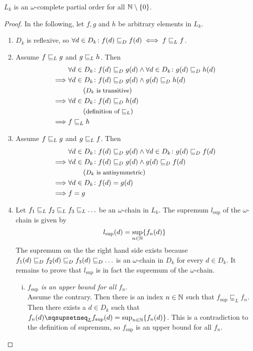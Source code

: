\begin{lemma}
	$L_k$ is an $\omega$-complete partial order for all $\mathbb{N} \setminus \{0\}$.
	\begin{proof}
		In the following, let $f, g$ and $h$ be arbitrary elements in $L_k$.
		\begin{enumerate}
			\item $D_k$ is reflexive, so $\forall d \in D_k \colon f(d) \sqsubseteq_{D} f(d)
			\iff f \sqsubseteq_{L} f$.
			
			\item Assume $f \sqsubseteq_{L} g$ and $g \sqsubseteq_{L} h$.
			Then \begin{align*}
				& \forall d \in D_k \colon f(d) \sqsubseteq_{D} g(d) \land
				\forall d \in D_k \colon g(d) \sqsubseteq_{D} h(d) \\
				\implies & \forall d \in D_k \colon f(d) \sqsubseteq_{D} g(d) \land g(d) \sqsubseteq_{D} h(d) \\
				& \hspace*{2em} \left(\text{\small $D_k$ is transitive}\right) \\
				\implies & \forall d \in D_k \colon f(d) \sqsubseteq_{D} h(d) \\
				& \hspace*{2em} \left(\text{\small definition of $\sqsubseteq_{L}$}\right) \\
				\implies & f \sqsubseteq_{L} h
			\end{align*}
			
			\item Assume $f \sqsubseteq_{L} g$ and $g \sqsubseteq_{L} f$.
			Then \begin{align*}
				& \forall d \in D_k \colon f(d) \sqsubseteq_{D} g(d) \land
				\forall d \in D_k \colon g(d) \sqsubseteq_{D} f(d) \\
				\implies & \forall d \in D_k \colon f(d) \sqsubseteq_{D} g(d) \land g(d) \sqsubseteq_{D} f(d) \\
				& \hspace*{2em} \left(\text{\small $D_k$ is antisymmetric}\right) \\
				\implies & \forall d \in D_k \colon f(d) = g(d) \\
				\implies & f = g
			\end{align*}
			
			\item Let $f_1 \sqsubseteq_{L} f_2 \sqsubseteq_{L} f_3 \sqsubseteq_{L} \ldots$ be an $\omega$-chain in $L_k$.
			The supremum $l_{\sup}$ of the $\omega$-chain is given by
			\[ l_{\sup}(d) = \sup_{n \in \mathbb{N}} \{ f_n(d) \} \]
			The supremum on the the right hand side exists because $f_1(d) \sqsubseteq_{D} f_2(d) \sqsubseteq_{D} f_3(d) \sqsubseteq_{D} \ldots$ is an $\omega$-chain in $D_k$ for every $d \in D_k$.
			It remains to prove that $l_{\sup}$ is in fact the supremum of the $\omega$-chain.
			\begin{enumerate}[i)]
				\item \textit{$f_{\sup}$ is an upper bound for all $f_n$}. \\
				Assume the contrary.
				Then there is an index $n \in \mathbb{N}$ such that $f_{\sup} \sqsubsetneq_L f_n$.
				Then there exists a $d \in D_k$ such that
				$f_n(d) \sqsupsetneq_L f_{\sup}(d) = \sup_{n \in \N} \{ f_n(d) \}$.
				This is a contradiction to the definition of supremum, so $f_{\sup}$ is an upper bound for all $f_n$.
				

\end{enumerate}
\end{enumerate}
\end{proof}
\end{lemma}
